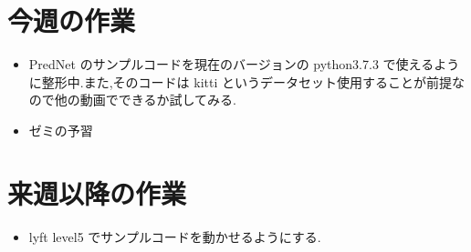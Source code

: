 \section{今週の作業}
\begin{itemize}
         \item PredNet のサンプルコードを現在のバージョンの python3.7.3 で使えるように整形中.また,そのコードは kitti というデータセット使用することが前提なので他の動画でできるか試してみる.
         \item ゼミの予習
\end{itemize}

\section{来週以降の作業}
\begin{itemize}
         \item lyft level5 でサンプルコードを動かせるようにする.
\end{itemize}





